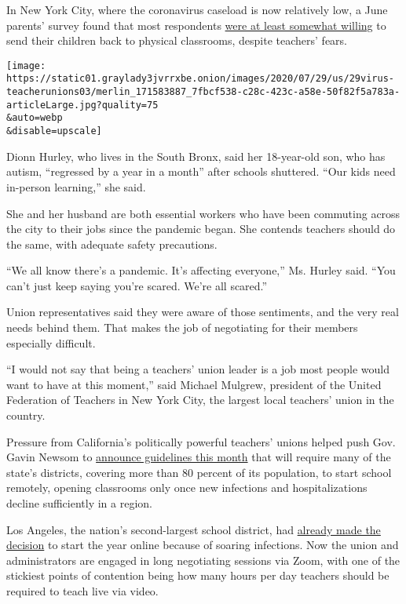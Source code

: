 In New York City, where the coronavirus caseload is now relatively low,
a June parents' survey found that most respondents
\href{https://www.nytimes3xbfgragh.onion/2020/07/06/nyregion/nyc-school-reopening-plan.html}{were
at least somewhat willing} to send their children back to physical
classrooms, despite teachers' fears.

\texttt{[image: https://static01.graylady3jvrrxbe.onion/images/2020/07/29/us/29virus-teacherunions03/merlin\_171583887\_7fbcf538-c28c-423c-a58e-50f82f5a783a-articleLarge.jpg?quality=75\\\&auto=webp\\\&disable=upscale]}

Dionn Hurley, who lives in the South Bronx, said her 18-year-old son,
who has autism, ``regressed by a year in a month'' after schools
shuttered. ``Our kids need in-person learning,'' she said.

She and her husband are both essential workers who have been commuting
across the city to their jobs since the pandemic began. She contends
teachers should do the same, with adequate safety precautions.

``We all know there's a pandemic. It's affecting everyone,'' Ms. Hurley
said. ``You can't just keep saying you're scared. We're all scared.''

Union representatives said they were aware of those sentiments, and the
very real needs behind them. That makes the job of negotiating for their
members especially difficult.

``I would not say that being a teachers' union leader is a job most
people would want to have at this moment,'' said Michael Mulgrew,
president of the United Federation of Teachers in New York City, the
largest local teachers' union in the country.

Pressure from California's politically powerful teachers' unions helped
push Gov. Gavin Newsom to
\href{https://www.nytimes3xbfgragh.onion/2020/07/17/us/california-schools-reopening-newsom.html}{announce
guidelines this month} that will require many of the state's districts,
covering more than 80 percent of its population, to start school
remotely, opening classrooms only once new infections and
hospitalizations decline sufficiently in a region.

Los Angeles, the nation's second-largest school district, had
\href{https://www.nytimes3xbfgragh.onion/2020/07/13/us/lausd-san-diego-school-reopening.html}{already
made the decision} to start the year online because of soaring
infections. Now the union and administrators are engaged in long
negotiating sessions via Zoom, with one of the stickiest points of
contention being how many hours per day teachers should be required to
teach live via video.

